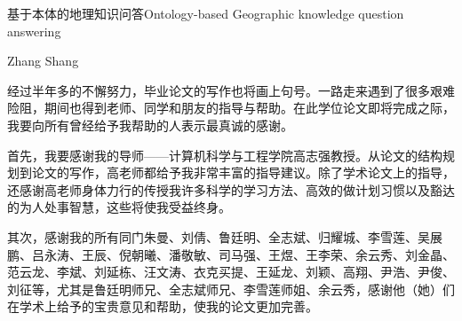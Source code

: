 \documentclass[nomlist,masters,openany]{seuthesix}
\begin{document}
\title{\quad}{基于本体的地理知识问答}{\quad}{Ontology-based Geographic knowledge question answering}
\author{张赏}{Zhang Shang}
\authorizedate{}
\committeechair{}
\reviewer{}{}
\makebigcover
\makecover


\tableofcontents
\listofothers

\mainmatter







%



\acknowledgement
经过半年多的不懈努力，毕业论文的写作也将画上句号。一路走来遇到了很多艰难险阻，期间也得到老师、同学和朋友的指导与帮助。在此学位论文即将完成之际，我要向所有曾经给予我帮助的人表示最真诚的感谢。

首先，我要感谢我的导师——计算机科学与工程学院高志强教授。从论文的结构规划到论文的写作，高老师都给予我非常丰富的指导建议。除了学术论文上的指导，还感谢高老师身体力行的传授我许多科学的学习方法、高效的做计划习惯以及豁达的为人处事智慧，这些将使我受益终身。

其次，感谢我的所有同门朱曼、刘倩、鲁廷明、全志斌、归耀城、李雪莲、吴展鹏、吕永涛、王辰、倪朝曦、潘敬敏、司马强、王煜、王李荣、余云秀、刘金晶、范云龙、李斌、刘延栋、汪文涛、衣克买提、王延龙、刘颖、高翔、尹浩、尹俊、刘征等，尤其是鲁廷明师兄、全志斌师兄、李雪莲师姐、余云秀，感谢他（她）们在学术上给予的宝贵意见和帮助，使我的论文更加完善。
\end{document}
